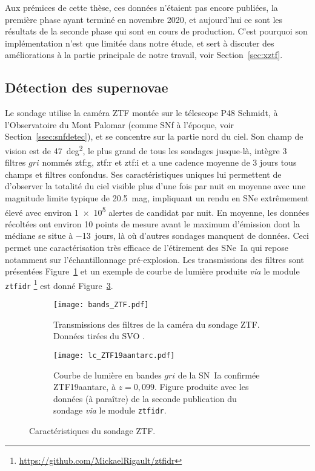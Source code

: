 \documentclass[../main/main.tex]{subfiles}
\begin{document}
Aux prémices de cette thèse, ces données n'étaient pas encore publiées, la
première phase ayant terminé en novembre 2020, et aujourd'hui ce sont les
résultats de la seconde phase qui sont en cours de production. C'est pourquoi
son implémentation n'est que limitée dans notre étude, et sert à discuter des
améliorations à la partie principale de notre travail, voir
Section~\ref{sec:xztf}.

\subsection{Détection des supernovae}\label{ssec:ztfdetec}

Le sondage utilise la caméra ZTF montée sur le télescope P48 Schmidt, à
l'Observatoire du Mont Palomar (comme SNf à l'époque, voir
Section~\ref{ssec:snfdetec}), et se concentre sur la partie nord du ciel. Son
champ de vision est de \SI{47}{deg^2}, le plus grand de tous les sondages
jusque-là, intègre 3 filtres $gri$ nommés ztf:g, ztf:r et ztf:i et a une cadence
moyenne de 3 jours tous champs et filtres confondus. Ses caractéristiques
uniques lui permettent de d'observer la totalité du ciel visible plus d'une fois
par nuit en moyenne avec une magnitude limite typique de \SI{20.5}{mag},
impliquant un rendu en SNe extrêmement élevé avec environ \num{1e5} alertes de
candidat par nuit. En moyenne, les données récoltées ont environ 10 points de
mesure avant le maximum d'émission dont la médiane se situe à \SI{-13}{jours},
là où d'autres sondages manquent de données. Ceci permet une caractérisation
très efficace de l'étirement des SNe~Ia qui repose notamment sur
l'échantillonnage pré-explosion. Les transmissions des filtres sont présentées
Figure~\ref{fig:ztfbands} et un exemple de courbe de lumière produite
\textit{via} le module \texttt{ztfidr}
\footnote{\label{fn:ztfidr}\href{https://github.com/MickaelRigault/ztfidr}
{https://github.com/MickaelRigault/ztfidr}} est donné Figure~\ref{fig:ztflc}. 

\begin{figure}[ht]
    \centering
    \begin{subfigure}[]{.49\linewidth}
        \centering
        \texttt{[image: bands\_ZTF.pdf]}
        \caption[Transmissions des filtres de la caméra du sondage ZTF]
        {Transmissions des filtres de la caméra du sondage ZTF. Données tirées
        du SVO \citep{rodrigo2020}.}
        \label{fig:ztfbands}
    \end{subfigure}
    \begin{subfigure}[]{.49\linewidth}
        \centering
        \texttt{[image: lc\_ZTF19aantarc.pdf]}
        \caption[Courbe de lumière de la SN ZTF19aantarc]{Courbe de lumière en
            bandes $gri$ de la SN~Ia confirmée ZTF19aantarc, à $z = 0,099$.
            Figure produite avec les données (à paraître) de la seconde
            publication du sondage \textit{via} le module
        \texttt{ztfidr}.}
        \label{fig:ztflc}
    \end{subfigure}
    \caption{Caractéristiques du sondage ZTF.}
\end{figure}
\end{document}

